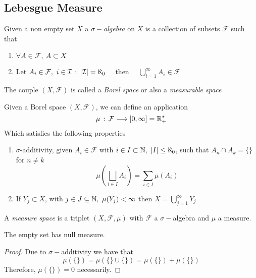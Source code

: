 \documentclass[../complete.tex]{subfiles}
\begin{document}
\subsection{Lebesgue Measure}
\begin{dfn}
	Given a non empty set $X$ a $\sigma-$\textit{algebra} on $X$ is a collection of subsets $\mathcal{F}$ such that
	\begin{enumerate}
	\item $\forall A\in\mathcal{F},\ A\subset X$
	\item Let $A_i\in\mathcal{F},\ i\in\mathcal{I}\st\abs{\mathcal{I}}=\aleph_0\quad$ then $\quad\bigcup_{i=1}^\infty A_i\in\mathcal{F}$
	\end{enumerate}
	The couple $(X,\mathcal{F})$ is called a \textit{Borel space} or also a \textit{measurable space}
\end{dfn}
\begin{dfn}[Measure]
	Given a Borel space $(X,\mathcal{F})$, we can define an application
	\begin{equation}
		\mu\st\mathcal{F}\fto[][0,\infty]=\R^\star_+
		\label{eq:measure}
	\end{equation}
	Which satisfies the following properties
	\begin{enumerate}
	\item $\sigma$-additivity, given $A_i\in\mathcal{F}$ with $i\in I\subset\N,\ \abs{I}\le\aleph_0$, such that $A_n\cap A_k=\{\}$ for $n\ne k$
		\begin{equation*}
			\mu\left( \bigsqcup_{i\in I}A_i \right)=\sum_{i\in I}\mu(A_i)
		\end{equation*}
	\item If $Y_j\subset X$, with $j\in J\subseteq\N,\ \mu(Y_j)<\infty$ then $X=\bigcup_{j=1}^\infty Y_j$
	\end{enumerate}
\end{dfn}
\begin{dfn}
	A \textit{measure space} is a triplet $(X,\mathcal{F},\mu)$ with $\mathcal{F}$ a $\sigma-$algebra and $\mu$ a measure.
\end{dfn}
\begin{rmk}
	The empty set has null measure.
\end{rmk}
\begin{proof}
	Due to $\sigma-$additivity we have that
	\begin{equation*}
		\mu(\{\})=\mu(\{\}\cup\{\})=\mu(\{\})+\mu(\{\})
	\end{equation*}
	Therefore, $\mu(\{\})=0$ necessarily.
\end{proof}
\end{document}
